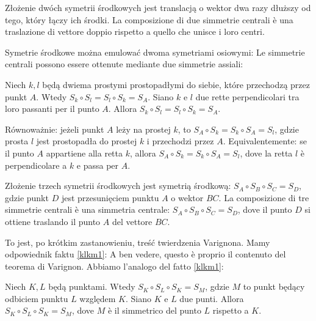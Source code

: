 \begin{proposition}
    Złożenie dwóch symetrii środkowych jest translacją o wektor dwa razy dłuższy od tego, który łączy ich środki. %
    La composizione di due simmetrie centrali è una traslazione di vettore doppio rispetto a quello che unisce i loro centri. %
\end{proposition}

Symetrie środkowe można emulować dwoma symetriami osiowymi: %
Le simmetrie centrali possono essere ottenute mediante due simmetrie assiali: %

\begin{proposition}
\label{two_axial_one_point}
    Niech $k, l$ będą dwiema prostymi prostopadłymi do siebie, które przechodzą przez punkt $A$. %
    Wtedy $S_k \circ S_l = S_l \circ S_k = S_A$. %
    Siano $k$ e $l$ due rette perpendicolari tra loro passanti per il punto $A$. %
    Allora $S_k \circ S_l = S_l \circ S_k = S_A$. %
\end{proposition}

Równoważnie: jeżeli punkt $A$ leży na prostej $k$, to $S_A \circ S_k = S_k \circ S_A = S_l$, gdzie prosta $l$ jest prostopadła do prostej $k$ i przechodzi przez $A$. %
Equivalentemente: se il punto $A$ appartiene alla retta $k$, allora $S_A \circ S_k = S_k \circ S_A = S_l$, dove la retta $l$ è perpendicolare a $k$ e passa per $A$. %

\begin{proposition}
    Złożenie trzech symetrii środkowych jest symetrią środkową: $S_A \circ S_B \circ S_C = S_D$, gdzie punkt $D$ jest przesunięciem punktu $A$ o wektor $BC$. %
    La composizione di tre simmetrie centrali è una simmetria centrale: $S_A \circ S_B \circ S_C = S_D$, dove il punto $D$ si ottiene traslando il punto $A$ del vettore $BC$. %
\end{proposition}

To jest, po krótkim zastanowieniu, treść twierdzenia Varignona. %
Mamy odpowiednik faktu \ref{klkm1}: %
A ben vedere, questo è proprio il contenuto del teorema di Varignon. %
Abbiamo l'analogo del fatto \ref{klkm1}: %

\begin{proposition}
\label{klkm2}
    Niech $K, L$ będą punktami. %
    Wtedy $S_K \circ S_L \circ S_K = S_M$, gdzie $M$ to punkt będący odbiciem punktu $L$ względem $K$. %
    Siano $K$ e $L$ due punti. %
    Allora $S_K \circ S_L \circ S_K = S_M$, dove $M$ è il simmetrico del punto $L$ rispetto a $K$. %
\end{proposition}

